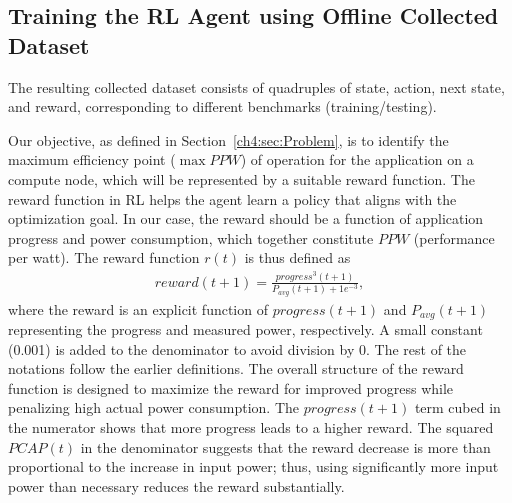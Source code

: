 \subsection{Training the RL Agent using Offline Collected Dataset}\label{ch4:sec:training}
The resulting collected dataset consists of quadruples of state, action, next state, and reward, corresponding to different benchmarks (training/testing). 



Our objective, as defined in Section~\ref{ch4:sec:Problem}, is to identify the maximum efficiency point ($\max{PPW}$) of operation for the application on a compute node, which will be represented by a suitable reward function. The reward function in RL helps the agent learn a policy that aligns with the optimization goal. In our case, the reward should be a function of application progress and power consumption, which together constitute $PPW$ (performance per watt). The reward function $r(t)$ is thus defined as
\begin{equation}
\begin{aligned}
reward(t+1) = \frac{progress^3(t+1)}{P_{avg}(t+1)+1e^{-3}},
\end{aligned}
\label{ch4:eq:reward_function}
\end{equation}
%
where the reward is an explicit function of $progress(t+1)$ and $P_{avg}(t+1)$ representing the progress and measured power, respectively. A small constant (0.001) is added to the denominator to avoid division by 0. The rest of the notations follow the earlier definitions. The overall structure of the reward function is designed to maximize the reward for improved progress while penalizing high actual power consumption. The $progress(t+1)$ term cubed in the numerator shows that more progress leads to a higher reward. 
The squared $PCAP(t)$ in the denominator suggests that the reward decrease is more than proportional to the increase in input power; thus, using significantly more input power than necessary reduces the reward substantially. 

